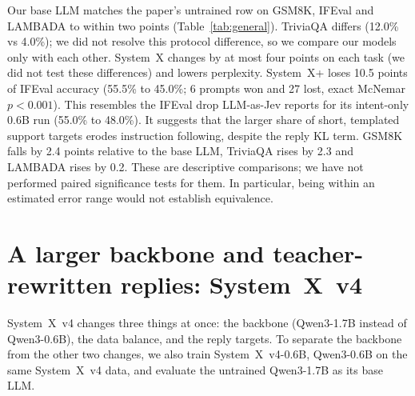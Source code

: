 \documentclass[11pt]{article}
\newcommand{\sysplus}{System~X+}
\newcommand{\sysfour}{System~X~v4}
\newcommand{\sysfoursmall}{System~X~v4-0.6B}
\begin{document}
Our base LLM matches the paper's untrained row on GSM8K, IFEval and LAMBADA to within two points (Table~\ref{tab:general}). TriviaQA differs (12.0\% vs 4.0\%); we did not resolve this protocol difference, so we compare our models only with each other. System~X changes by at most four points on each task (we did not test these differences) and lowers perplexity. \sysplus{} loses 10.5 points of IFEval accuracy (55.5\% to 45.0\%; 6 prompts won and 27 lost, exact McNemar $p<0.001$). This resembles the IFEval drop LLM-as-Jev reports for its intent-only 0.6B run (55.0\% to 48.0\%). It suggests that the larger share of short, templated support targets erodes instruction following, despite the reply KL term. GSM8K falls by 2.4 points relative to the base LLM, TriviaQA rises by 2.3 and LAMBADA rises by 0.2. These are descriptive comparisons; we have not performed paired significance tests for them. In particular, being within an estimated error range would not establish equivalence.

\section{A larger backbone and teacher-rewritten replies: \sysfour}\label{sec:v4}

\sysfour{} changes three things at once: the backbone (Qwen3-1.7B instead of Qwen3-0.6B), the data balance, and the reply targets. To separate the backbone from the other two changes, we also train \sysfoursmall, Qwen3-0.6B on the same \sysfour{} data, and evaluate the untrained Qwen3-1.7B as its base LLM.
\end{document}
